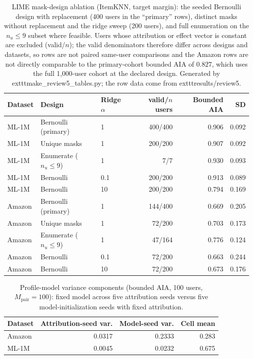 \begin{table}[!htbp]\centering\scriptsize\setlength{\tabcolsep}{3pt}
\caption{LIME mask-design ablation (ItemKNN, target margin): the seeded
Bernoulli design with replacement (400 users in the ``primary'' rows),
distinct masks without replacement and the ridge sweep (200 users), and full
enumeration on the $n_u\le9$ subset where feasible. Users whose attribution
or effect vector is constant are excluded (valid/$n$); the valid denominators
therefore differ across designs and datasets, so rows are not paired
same-user comparisons and the Amazon rows are not directly comparable to the
primary-cohort bounded AIA of $0.827$, which uses the full 1,000-user cohort
at the declared design.
Generated by 	exttt{make\_review5\_tables.py}; the row data come from
	exttt{results/review5}.}
\label{tab:review5-lime-masks}
\begin{tabular}{@{}lllrrr@{}}
\toprule
Dataset & Design & Ridge $\alpha$ & valid/$n$ users & Bounded AIA & SD \\
\midrule
ML-1M & Bernoulli (primary) & 1 & 400/400 & 0.906 & 0.092 \\
ML-1M & Unique masks & 1 & 200/200 & 0.907 & 0.092 \\
ML-1M & Enumerate ($n_u\le9$) & 1 & 7/7 & 0.930 & 0.093 \\
ML-1M & Bernoulli & 0.1 & 200/200 & 0.913 & 0.089 \\
ML-1M & Bernoulli & 10 & 200/200 & 0.794 & 0.169 \\
Amazon & Bernoulli (primary) & 1 & 144/400 & 0.669 & 0.205 \\
Amazon & Unique masks & 1 & 72/200 & 0.703 & 0.173 \\
Amazon & Enumerate ($n_u\le9$) & 1 & 47/164 & 0.776 & 0.124 \\
Amazon & Bernoulli & 0.1 & 72/200 & 0.663 & 0.244 \\
Amazon & Bernoulli & 10 & 72/200 & 0.673 & 0.176 \\
\bottomrule
\end{tabular}
\end{table}
\begin{table}[!htbp]\centering\scriptsize\setlength{\tabcolsep}{3pt}
\caption{Profile-model variance components (bounded AIA, 100 users,
$M_{\mathrm{pair}}=100$): fixed model across five attribution seeds versus
five model-initialization seeds with fixed attribution.}
\label{tab:review5-variance}
\begin{tabular}{@{}lrrr@{}}
\toprule
Dataset & Attribution-seed var. & Model-seed var. & Cell mean \\
\midrule
Amazon & 0.0317 & 0.2333 & 0.283 \\
ML-1M & 0.0045 & 0.0232 & 0.675 \\
\bottomrule
\end{tabular}
\end{table}
